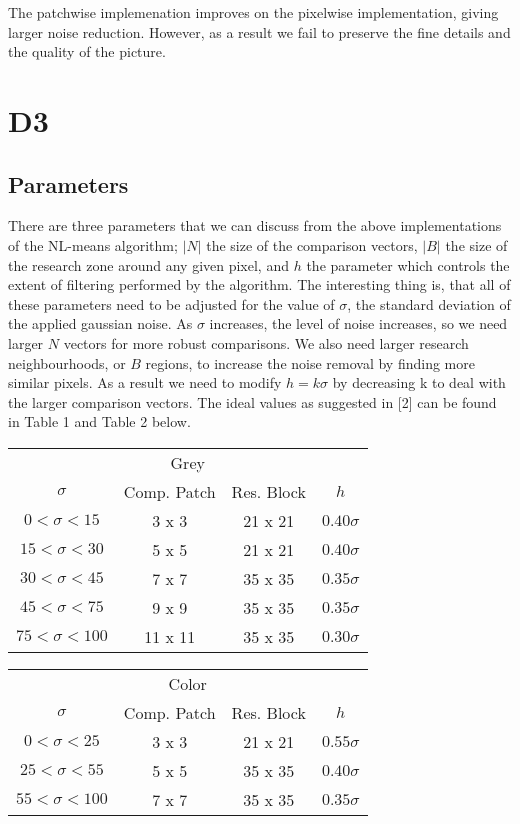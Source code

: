 \documentclass[fullpage]{article}
\begin{document}
The patchwise implemenation improves on the pixelwise implementation, giving larger noise reduction. However, as a result we fail to preserve the fine details and the quality of the picture.
\section{D3}
\subsection{Parameters}

There are three parameters that we can discuss from the above implementations of the NL-means algorithm; $|N|$ the size of the comparison vectors, $|B|$ the size of the research zone around any given pixel,  and $h$ the parameter which controls the extent of filtering performed by the algorithm. The interesting thing is, that all of these parameters need to be adjusted for the value of $\sigma$, the standard deviation of the applied gaussian noise. As $\sigma$ increases, the level of noise increases, so we need larger $N$ vectors for more robust comparisons. We also need larger research neighbourhoods, or $B$ regions, to increase the noise removal by finding more similar pixels. As a result we need to modify $h = k \sigma$ by decreasing k to deal with the larger comparison vectors. The ideal values as suggested in [2] can be found in Table 1 and Table 2 below. \newline
\newline
\begin{tabular}{cccc}
\multicolumn{4}{c}{Grey}\\
$\sigma$ & Comp. Patch  & Res. Block  & $h$ \\
\hline
$0 < \sigma < 15$ & 3 x 3 & 21 x 21 & $0.40 \sigma$ \\
$15 < \sigma < 30$ & 5 x 5 & 21 x 21 & $0.40 \sigma$ \\
$30 < \sigma < 45$ & 7 x 7 & 35 x 35 & $0.35 \sigma$ \\
$45 < \sigma < 75$ & 9 x 9 & 35 x 35 & $0.35 \sigma$ \\
$75 < \sigma < 100$ & 11 x 11 & 35 x 35 & $0.30 \sigma$ \\
\end{tabular}
\begin{tabular}{cccc}
\multicolumn{4}{c}{Color}\\
$\sigma$ & Comp. Patch  & Res. Block  & $h$ \\
\hline
$0 < \sigma < 25$ & 3 x 3 & 21 x 21 & $0.55 \sigma$ \\
$25 < \sigma < 55$ & 5 x 5 & 35 x 35 & $0.40 \sigma$ \\
$55 < \sigma < 100$ & 7 x 7 & 35 x 35 & $0.35 \sigma$ \\
\end{tabular}
\end{document}
